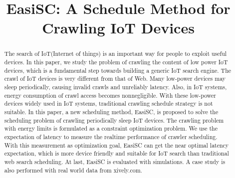 \documentclass[conference]{IEEEtran}
\begin{document}
%
\title{EasiSC: A Schedule Method for \\Crawling IoT Devices}

\author{
}

\maketitle


\begin{abstract}
The search of IoT(Internet of things) is an important way for people to exploit useful devices. In this paper, we study the problem of crawling the content of low power IoT devices, which is a fundamental step towards building a generic IoT search engine.
The crawl of IoT devices is very different from that of Web. Many low-power devices may sleep periodically, causing invalid crawls and unreliably latency. Also, in IoT systems, energy consumption of crawl access becomes nonnegligible.
With these low-power devices widely used in IoT systems, traditional crawling schedule strategy is not suitable.
In this paper, a new scheduling method, EasiSC, is proposed to solve the scheduling problem of crawling periodically sleep IoT devices. The crawling problem with energy limits is formulated as a constraint optimization problem. We use the expectation of latency to measure the realtime performance of crawler scheduling. With this measurement as optimization goal, EasiSC can get the near optimal latency expectation, which is more device friendly and suitable for IoT search than traditional web search scheduling.
At last, EasiSC is evaluated with simulations. A case study is also performed with real world data from xively.com.
\end{abstract}
\end{document}
